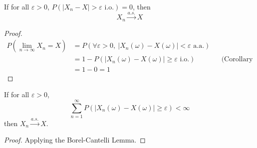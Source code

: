 \begin{reqproof}
\begin{proposition}[][5.5.1]
    If for all $\varepsilon > 0$, $P(\left|X_n - X\right| > \varepsilon \text{ i.o.}) = 0$, then
    \[X_n \overset{a.s.}{\longrightarrow} X\]
    \begin{proof}
        \begin{align*}
            P(\lim_{n\to \infty}X_n = X) &= P(\forall \varepsilon > 0,\ \left|X_n(\omega) - X(\omega)\right| < \varepsilon \text{ a.a.})\\
            &= 1-P(\left|X_n(\omega) - X(\omega)\right| \geq \varepsilon \text{ i.o.}) & &\text{(Corollary 5.2.1)}\\
            &= 1-0 = 1
        \end{align*}
    \end{proof}
\end{proposition}
\end{reqproof}

\begin{reqproof}
\begin{proposition}[][5.5.2]
    If for all $\varepsilon > 0$,
    \[\sum_{n=1}^{\infty} P(\left|X_n(\omega) - X(\omega)\right| \geq \varepsilon) < \infty\]
    then $X_n \overset{a.s.}{\longrightarrow} X$.
    \begin{proof}
        Applying the Borel-Cantelli Lemma.
    \end{proof}
\end{proposition}
\end{reqproof}

